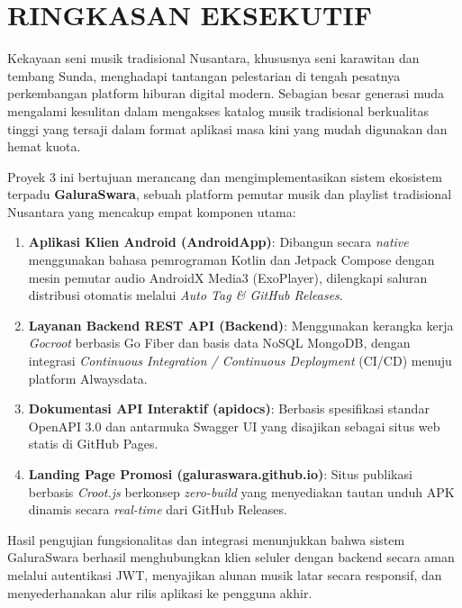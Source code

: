 \section*{RINGKASAN EKSEKUTIF}

Kekayaan seni musik tradisional Nusantara, khususnya seni karawitan dan tembang Sunda, menghadapi tantangan pelestarian di tengah pesatnya perkembangan platform hiburan digital modern. Sebagian besar generasi muda mengalami kesulitan dalam mengakses katalog musik tradisional berkualitas tinggi yang tersaji dalam format aplikasi masa kini yang mudah digunakan dan hemat kuota. 

Proyek 3 ini bertujuan merancang dan mengimplementasikan sistem ekosistem terpadu \textbf{GaluraSwara}, sebuah platform pemutar musik dan playlist tradisional Nusantara yang mencakup empat komponen utama:
\begin{enumerate}
    \item \textbf{Aplikasi Klien Android (AndroidApp)}: Dibangun secara \textit{native} menggunakan bahasa pemrograman Kotlin dan Jetpack Compose dengan mesin pemutar audio AndroidX Media3 (ExoPlayer), dilengkapi saluran distribusi otomatis melalui \textit{Auto Tag \& GitHub Releases}.
    \item \textbf{Layanan Backend REST API (Backend)}: Menggunakan kerangka kerja \textit{Gocroot} berbasis Go Fiber dan basis data NoSQL MongoDB, dengan integrasi \textit{Continuous Integration / Continuous Deployment} (CI/CD) menuju platform Alwaysdata.
    \item \textbf{Dokumentasi API Interaktif (apidocs)}: Berbasis spesifikasi standar OpenAPI 3.0 dan antarmuka Swagger UI yang disajikan sebagai situs web statis di GitHub Pages.
    \item \textbf{Landing Page Promosi (galuraswara.github.io)}: Situs publikasi berbasis \textit{Croot.js} berkonsep \textit{zero-build} yang menyediakan tautan unduh APK dinamis secara \textit{real-time} dari GitHub Releases.
\end{enumerate}

Hasil pengujian fungsionalitas dan integrasi menunjukkan bahwa sistem GaluraSwara berhasil menghubungkan klien seluler dengan backend secara aman melalui autentikasi JWT, menyajikan alunan musik latar secara responsif, dan menyederhanakan alur rilis aplikasi ke pengguna akhir.
